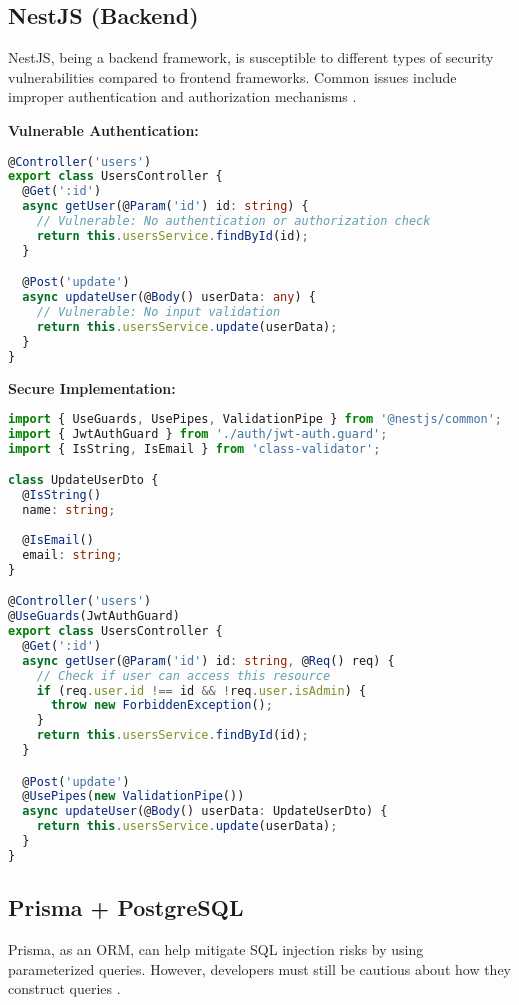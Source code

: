 \documentclass[conference]{IEEEtran}
\begin{document}
\subsection{NestJS (Backend)}
NestJS, being a backend framework, is susceptible to different types of security vulnerabilities compared to frontend frameworks. Common issues include improper authentication and authorization mechanisms \cite{nestjs}.

\textbf{Vulnerable Authentication:}

\begin{lstlisting}[language=TypeScript, caption=Vulnerable NestJS endpoint without proper validation]
@Controller('users')
export class UsersController {
  @Get(':id')
  async getUser(@Param('id') id: string) {
    // Vulnerable: No authentication or authorization check
    return this.usersService.findById(id);
  }

  @Post('update')
  async updateUser(@Body() userData: any) {
    // Vulnerable: No input validation
    return this.usersService.update(userData);
  }
}
\end{lstlisting}

\textbf{Secure Implementation:}

\begin{lstlisting}[language=TypeScript, caption=Secure NestJS endpoint with proper guards and validation]
import { UseGuards, UsePipes, ValidationPipe } from '@nestjs/common';
import { JwtAuthGuard } from './auth/jwt-auth.guard';
import { IsString, IsEmail } from 'class-validator';

class UpdateUserDto {
  @IsString()
  name: string;
  
  @IsEmail()
  email: string;
}

@Controller('users')
@UseGuards(JwtAuthGuard)
export class UsersController {
  @Get(':id')
  async getUser(@Param('id') id: string, @Req() req) {
    // Check if user can access this resource
    if (req.user.id !== id && !req.user.isAdmin) {
      throw new ForbiddenException();
    }
    return this.usersService.findById(id);
  }

  @Post('update')
  @UsePipes(new ValidationPipe())
  async updateUser(@Body() userData: UpdateUserDto) {
    return this.usersService.update(userData);
  }
}
\end{lstlisting}

\subsection{Prisma + PostgreSQL}
Prisma, as an ORM, can help mitigate SQL injection risks by using parameterized queries. However, developers must still be cautious about how they construct queries \cite{databaseFlaw}.
\end{document}
